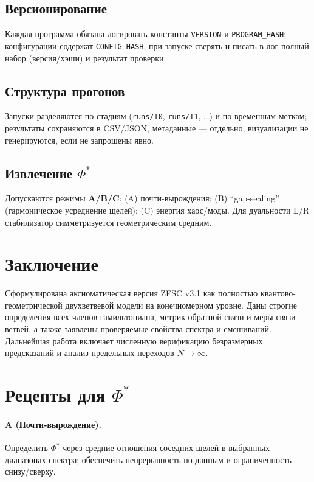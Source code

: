 \documentclass[a4paper,12pt]{article}
\begin{document}
\subsection*{Версионирование}
Каждая программа обязана логировать константы \texttt{VERSION} и \texttt{PROGRAM\_HASH}; конфигурации содержат \texttt{CONFIG\_HASH}; при запуске сверять и писать в лог полный набор (версия/хэши) и результат проверки.

\subsection*{Структура прогонов}
Запуски разделяются по стадиям (\texttt{runs/T0}, \texttt{runs/T1}, \dots) и по временным меткам; результаты сохраняются в CSV/JSON, метаданные --- отдельно; визуализации не генерируются, если не запрошены явно.

\subsection*{Извлечение \texorpdfstring{$\Phi^\ast$}{Phi*}}
Допускаются режимы \textbf{A/B/C}: (A) почти-вырождения; (B) ``gap-sealing'' (гармоническое усреднение щелей); (C) энергия хаос/моды.
Для дуальности L/R стабилизатор симметризуется геометрическим средним.

\section{Заключение}
Сформулирована аксиоматическая версия ZFSC v3.1 как полностью квантово-геометрической двухветвевой модели на конечномерном уровне.
Даны строгие определения всех членов гамильтониана, метрик обратной связи и меры связи ветвей, а также заявлены проверяемые свойства спектра и смешиваний.
Дальнейшая работа включает численную верификацию безразмерных предсказаний и анализ предельных переходов $N\to\infty$.

\appendix

\section{Рецепты для \texorpdfstring{$\Phi^\ast$}{Phi*}}
\paragraph{A (Почти-вырождение).} Определить $\Phi^\ast$ через средние отношения соседних щелей в выбранных диапазонах спектра; обеспечить непрерывность по данным и ограниченность снизу/сверху.
\end{document}
